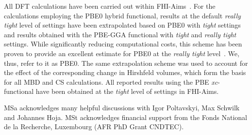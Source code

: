 \documentclass[aps,prl,groupaddress, twocolumn]{revtex4-1}
\begin{document}
All DFT calculations have been carried out within FHI-Aims~\cite{fhi_aims}. For the calculations employing the PBE0 hybrid functional, results at the default \emph{really tight} level of settings have been extrapolated based on PBE0 with \emph{tight} settings and results obtained with the PBE-GGA functional with \emph{tight} and \emph{really tight} settings. While significantly reducing computational costs, this scheme has been proven to provide an excellent estimate for PBE0 at the \emph{really tight} level~\cite{Hoja2018}. We, thus, refer to it as PBE0. The same extrapolation scheme was used to account for the effect of the corresponding change in Hirshfeld volumes, which form the basis for all MBD and CS calculations. All reported results using the PBE \textit{xc}-functional have been obtained at the \emph{tight} level of settings in FHI-Aims.
	 
\begin{acknowledgements}
 MSa acknowledges many helpful discussions with Igor Poltavskyi, Max Schwilk and Johannes Hoja.
 MSt acknowledges financial support from the Fonds National de la Recherche, Luxembourg (AFR PhD Grant CNDTEC).
\end{acknowledgements}


\end{document}
